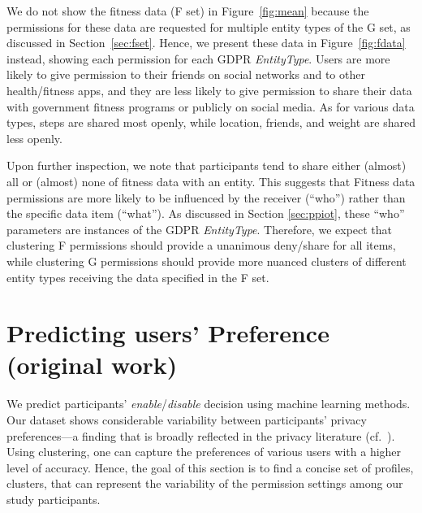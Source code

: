 We do not show the fitness data (F set) in Figure~\ref{fig:mean} because the permissions for these data are requested for multiple entity types of the G set, as discussed in Section~\ref{sec:fset}. Hence, we present these data in Figure~\ref{fig:fdata} instead, showing each permission for each GDPR \textit{EntityType}. 
Users are more likely to give permission to their friends on social networks and to other health/fitness apps, and they are less likely to give permission to share their data with government fitness programs or publicly on social media. As for various data types, steps are shared most openly, while location, friends, and weight are shared less openly.

Upon further inspection, we note that participants tend to share either (almost) all or (almost) none of fitness data with an entity. This suggests that Fitness data permissions are more likely to be influenced by the receiver (``who'') rather than the specific data item (``what'').
As discussed in Section \ref{sec:ppiot}, these ``who'' parameters are instances of the GDPR \textit{EntityType}. Therefore, we expect that clustering F permissions should provide a unanimous deny/share for all items, while clustering G permissions should provide more nuanced clusters of different entity types receiving the data specified in the F set.


\section{Predicting users' Preference (original work)}
We predict participants' \textit{enable}/\textit{disable} decision using machine learning methods. Our dataset shows considerable variability between participants' privacy preferences---a finding that is broadly reflected in the privacy literature (cf.~\cite{knijnenburg2013dimensionality}). Using clustering, one can capture the preferences of various users with a higher level of accuracy. Hence, the goal of this section is to find a concise set of profiles, clusters, that can represent the variability of the permission settings among our study participants. 

